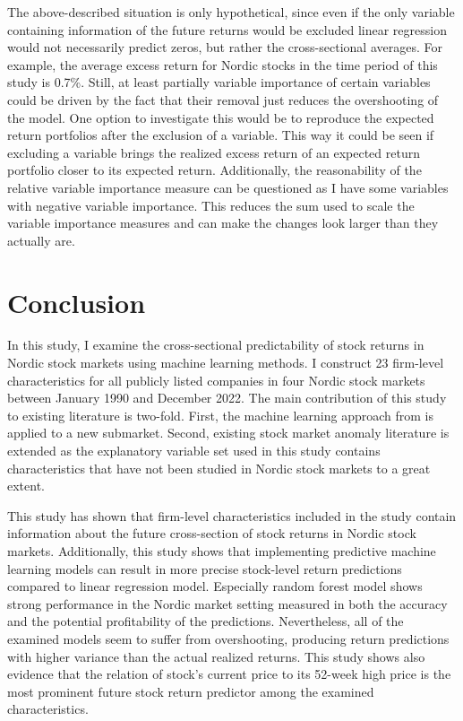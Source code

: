 \documentclass[12pt]{article}
\begin{document}
The above-described situation is only hypothetical, since even if the only variable containing information of the future returns would be excluded linear regression would not necessarily predict zeros, but rather the cross-sectional averages. For example, the average excess return for Nordic stocks in the time period of this study is 0.7\%. Still, at least partially variable importance of certain variables could be driven by the fact that their removal just reduces the overshooting of the model. One option to investigate this would be to reproduce the expected return portfolios after the exclusion of a variable. This way it could be seen if excluding a variable brings the realized excess return of an expected return portfolio closer to its expected return. Additionally, the reasonability of the relative variable importance measure can be questioned as I have some variables with negative variable importance. This reduces the sum used to scale the variable importance measures and can make the changes look larger than they actually are. \par

\section{Conclusion}\label{Conclusion}

In this study, I examine the cross-sectional predictability of stock returns in Nordic stock markets using machine learning methods. I construct 23 firm-level characteristics for all publicly listed companies in four Nordic stock markets between January 1990 and December 2022. The main contribution of this study to existing literature is two-fold. First, the machine learning approach from \citet{guetal} is applied to a new submarket.\footnotemark {} Second, existing stock market anomaly literature is extended as the explanatory variable set used in this study contains characteristics that have not been studied in Nordic stock markets to a great extent. \par

This study has shown that firm-level characteristics included in the study contain information about the future cross-section of stock returns in Nordic stock markets. Additionally, this study shows that implementing predictive machine learning models can result in more precise stock-level return predictions compared to linear regression model. Especially random forest model shows strong performance in the Nordic market setting measured in both the accuracy and the potential profitability of the predictions. Nevertheless, all of the examined models seem to suffer from overshooting, producing return predictions with higher variance than the actual realized returns. This study shows also evidence that the relation of stock's current price to its 52-week high price is the most prominent future stock return predictor among the examined characteristics. \par
\end{document}
